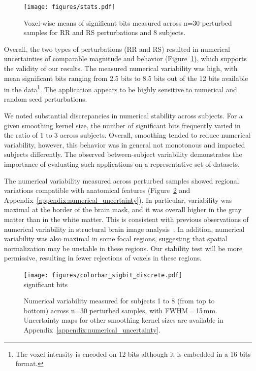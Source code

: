 \documentclass[lettersize,journal]{IEEEtran}
\begin{document}
\begin{figure}
  \centering
  \texttt{[image: figures/stats.pdf]}
  \caption{Voxel-wise means of significant bits
    measured across n=30 perturbed samples for RR and RS perturbations and 8
    subjects.}
  \label{fig:significant-digits}
\end{figure}
Overall, the two types of perturbations (RR and RS) resulted in numerical uncertainties of comparable magnitude and behavior (Figure~\ref{fig:significant-digits}), which supports the validity of our results. The measured numerical variability was high, with mean significant bits ranging from 2.5 bits to 8.5 bits out of the 12 bits available in the data\footnote{The voxel intensity is encoded on 12 bits although it is embedded in a 16 bits format.}. The application appears to be highly sensitive to numerical and random seed perturbations.

We noted substantial discrepancies in numerical stability across subjects. For
a given smoothing kernel size, the number of significant bits frequently varied
in the ratio of 1 to 3 across subjects. Overall, smoothing tended to reduce
numerical variability, however, this behavior was in general not monotonous and
impacted subjects differently. The observed between-subject variability
demonstrates the importance of evaluating such applications on a representative
set of datasets.

The numerical variability measured across perturbed samples showed regional
variations compatible with anatomical features
(Figure~\ref{fig:uncertainty-maps} and
Appendix~\ref{appendix:numerical_uncertainty}). In particular, variability was
maximal at the border of the brain mask, and it was overall higher in the gray
matter than in the white matter. This is consistent with previous observations
of numerical variability in structural brain image
analysis~\cite{salari2021accurate}. In addition, numerical variability was also
maximal in some focal regions, suggesting that spatial normalization may be
unstable in these regions. Our stability test will be more permissive,
resulting in fewer rejections of voxels in these regions.

\begin{figure}
  \vspace*{-20pt}\hspace{15pt}
  \texttt{[image: figures/colorbar\_sigbit\_discrete.pdf]} \\
  \vspace*{-5pt}
  significant bits
  \caption{Numerical variability measured for subjects 1 to 8 (from top to bottom) across n=30 perturbed samples, with FWHM\,=\,15\,mm. Uncertainty maps for other smoothing kernel sizes are available in Appendix~\ref{appendix:numerical_uncertainty}.}
  \label{fig:uncertainty-maps}
\end{figure}
\end{document}

